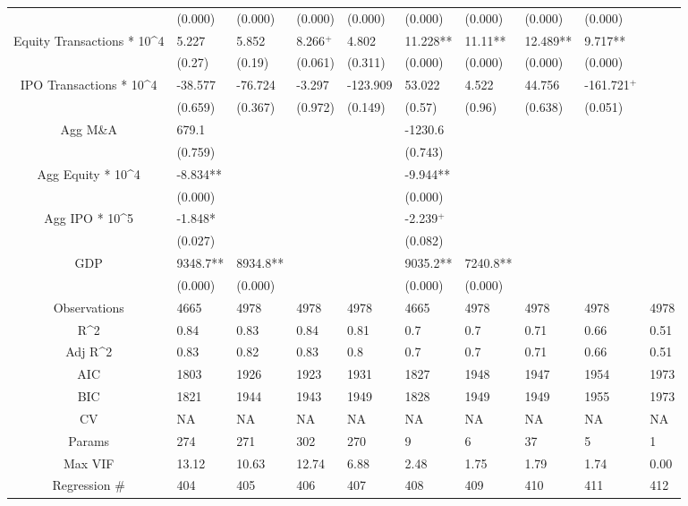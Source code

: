 \documentclass{article}
\begin{document}
\begin{table}[H]
\begin{tabular}{|clllllllll|}
   & (0.000) & (0.000) & (0.000) & (0.000) & (0.000) & (0.000) & (0.000) & (0.000) &  \\ 
  Equity Transactions * 10^4 & 5.227 & 5.852 & 8.266$^{+}$ & 4.802 & 11.228** & 11.11** & 12.489** & 9.717** &  \\ 
   & (0.27) & (0.19) & (0.061) & (0.311) & (0.000) & (0.000) & (0.000) & (0.000) &  \\ 
  IPO Transactions * 10^4 & -38.577 & -76.724 & -3.297 & -123.909 & 53.022 & 4.522 & 44.756 & -161.721$^{+}$ &  \\ 
   & (0.659) & (0.367) & (0.972) & (0.149) & (0.57) & (0.96) & (0.638) & (0.051) &  \\ 
  Agg M\&A & 679.1 &  &  &  & -1230.6 &  &  &  &  \\ 
   & (0.759) &  &  &  & (0.743) &  &  &  &  \\ 
  Agg Equity * 10^4 & -8.834** &  &  &  & -9.944** &  &  &  &  \\ 
   & (0.000) &  &  &  & (0.000) &  &  &  &  \\ 
  Agg IPO * 10^5 & -1.848* &  &  &  & -2.239$^{+}$ &  &  &  &  \\ 
   & (0.027) &  &  &  & (0.082) &  &  &  &  \\ 
  GDP & 9348.7** & 8934.8** &  &  & 9035.2** & 7240.8** &  &  &  \\ 
   & (0.000) & (0.000) &  &  & (0.000) & (0.000) &  &  &  \\ 
  \hline 
 Observations & 4665 & 4978 & 4978 & 4978 & 4665 & 4978 & 4978 & 4978 & 4978 \\ 
  R^2 & 0.84 & 0.83 & 0.84 & 0.81 & 0.7 & 0.7 & 0.71 & 0.66 & 0.51 \\ 
  Adj R^2 & 0.83 & 0.82 & 0.83 & 0.8 & 0.7 & 0.7 & 0.71 & 0.66 & 0.51 \\ 
  AIC & 1803 & 1926 & 1923 & 1931 & 1827 & 1948 & 1947 & 1954 & 1973 \\ 
  BIC & 1821 & 1944 & 1943 & 1949 & 1828 & 1949 & 1949 & 1955 & 1973 \\ 
  CV & NA & NA & NA & NA & NA & NA & NA & NA & NA \\ 
  Params & 274 & 271 & 302 & 270 & 9 & 6 & 37 & 5 & 1 \\ 
  Max VIF & 13.12 & 10.63 & 12.74 & 6.88 & 2.48 & 1.75 & 1.79 & 1.74 & 0.00 \\ 
  Regression \# & 404 & 405 & 406 & 407 & 408 & 409 & 410 & 411 & 412 \\ 
   \hline
\end{tabular}
 
\end{table}
\end{document}
